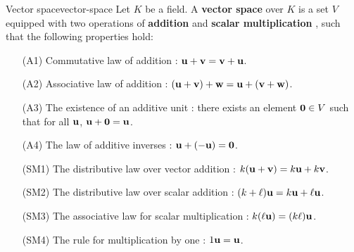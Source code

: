 \begin{definition}{Vector space}{vector-space}
  Let $K$ be a field. A \textbf{vector space} over $K$%
   is a set $V$ equipped with two operations of
  \textbf{addition}%
    and
  \textbf{scalar multiplication}%
  ,
  such that the following properties hold:
  \begin{itemize}\setlength\itemsep{0em}
  \item[(A1)] Commutative law of addition%
    :
    $\vect{u} + \vect{v}=\vect{v} + \vect{u}$.
  \item[(A2)] Associative law of addition%
    :
    $(\vect{u} + \vect{v}) + \vect{w}=\vect{u} + (\vect{v} + \vect{w})$.
  \item[(A3)] The existence of an additive unit%
    : there exists an element $\vect{0}\in
    V$ such that for all $\vect{u}$,
    $\vect{u} + \vect{0}=\vect{u}$.
  \item[(A4)] The law of additive inverses%
    :
    $\vect{u} + (-\vect{u}) =\vect{0}$.
  \item[(SM1)] The distributive law over vector addition%
    :
    $k(\vect{u} + \vect{v}) = k\vect{u} + k\vect{v}$.
  \item[(SM2)] The distributive law over scalar addition%
    :
    $(k + \ell) \vect{u} = k \vect{u} + \ell\vect{u}$.
  \item[(SM3)] The associative law for scalar multiplication%
    :
    $k(\ell\vect{u}) = (k \ell)\vect{u}$.
  \item[(SM4)] The rule for multiplication by one%
    :
    $1\vect{u}=\vect{u}$.
  \end{itemize}
\end{definition}

